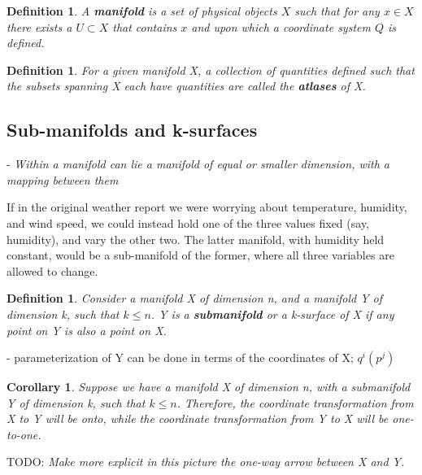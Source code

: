 \documentclass{book}
\newtheorem{defn}[equation]{Definition}
\newtheorem{coro}[equation]{Corollary}
\begin{document}
 
\begin{defn}
	A \textbf{manifold} is a set of physical objects $X$ such that for any $x \in X$ there exists a $U \subset X$ that contains $x$ and upon which a coordinate system $Q$ is defined.
\end{defn}

\begin{defn}
	For a given manifold X, a collection of quantities defined such that the subsets spanning X each have quantities are called the \textbf{atlases} of X. 
\end{defn}



\subsection{Sub-manifolds and k-surfaces}

- \emph{Within a manifold can lie a manifold of equal or smaller dimension, with a mapping between them}

If in the original weather report we were worrying about temperature, humidity, and wind speed, we could instead hold one of the three values fixed (say, humidity), and vary the other two. The latter manifold, with humidity held constant, would be a sub-manifold of the former, where all three variables are allowed to change.  



\begin{defn}
	Consider a manifold X of dimension n, and a manifold Y of dimension k, such that $k \leq n$. Y is a \textbf{submanifold} or a k-surface of X if any point on Y is also a point on X. 
\end{defn}

- parameterization of Y can be done in terms of the coordinates of X; $q^i(p^j)$



\begin{coro}
	Suppose we have a manifold X of dimension n, with a submanifold Y of dimension k, such that $k \leq n$. Therefore, the coordinate transformation from X to Y will be onto, while the coordinate transformation from Y to X will be one-to-one. 
\end{coro}


TODO: \emph{Make more explicit in this picture the one-way arrow between X and Y.}

\end{document}
